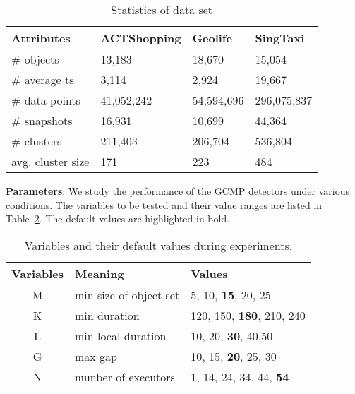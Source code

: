 \begin{table} [h]
\center
\small
\begin{tabular}{|l|l|l|l|}
\hline
 \textbf{Attributes}& \textbf{ACTShopping} &  \textbf{Geolife} &  \textbf{SingTaxi} \\ 
\hline 
\# objects  & 13,183 & 18,670 & 15,054\\ 
\hline
\# average ts & 3,114  & 2,924 & 19,667 \\ 
\hline
\# data points  & 41,052,242 & 54,594,696 & 296,075,837\\ 
\hline
\# snapshots  & 16,931 & 10,699 & 44,364\\ 
\hline
\# clusters  & 211,403  & 206,704& 536,804\\
\hline
avg. cluster size  & 171 & 223 & 484\\
\hline
\end{tabular}
\caption{Statistics of data set}
\label{exp:dataset}
\end{table}

\textbf{Parameters}: We study the performance of 
the GCMP detectors under various conditions. The variables
to be tested and their value ranges are listed in Table~\ref{tbl:parameters}. 
The default values are highlighted in bold.
\begin{table}[h]
\small
\begin{tabular}{c|l|l}
\hline 
\textbf{Variables} & \textbf{Meaning} & \textbf{Values} \\ 
\hline 
M & min size of object set &  5, 10,  \textbf{15}, 20, 25 \\ 
\hline 
K & min duration & 120, 150, \textbf{180}, 210, 240 \\ 
\hline 
L & min local duration & 10, 20, \textbf{30}, 40,50 \\ 
\hline 
G & max gap & 10, 15, \textbf{20}, 25, 30 \\ 
\hline
N & number of executors & 1, 14, 24, 34, 44, \textbf{54}\\ 
\hline 
\end{tabular} 
\caption{Variables and their default values during experiments.}
\label{tbl:parameters}
\end{table}

